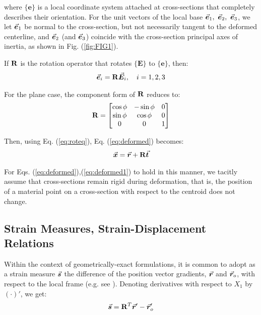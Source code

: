 \noindent where $\{\mathbf{e}\}$ is a local coordinate system attached at
cross-sections that completely describes their orientation. For the unit vectors
of the local base $\vec{\bm{e}}_1,\ \vec{\bm{e}}_2,\ \vec{\bm{e}}_3$, we let $\vec{\bm{e}}_1$ be
normal to the cross-section, but not necessarily tangent to the deformed
centerline, and $\vec{\bm{e}}_2$ (and $\vec{\bm{e}}_3$) coincide with the cross-section
principal axes of inertia, as shown in Fig. (\ref{fig:FIG1}).

If $\mathbf{R}$ is the rotation operator that rotates $\{\mathbf{E}\}$ to
$\{\mathbf{e}\}$, then:
\begin{gather}
	\vec{\bm{e}}_i = \mathbf{R}\vec{\bm{E}}_i ,\quad i=1,2,3
	\label{eq:roteq}
\end{gather}

\noindent For the plane case, the component form of $\mathbf{R}$ reduces to:
\begin{gather}
	\mathbf{R} = \begin{bmatrix}
		\cos\phi &-\sin\phi & 0\\
		\sin\phi &\cos\phi & 0\\
		0 & 0 & 1
	\end{bmatrix}
\end{gather}

\noindent Then, using Eq. (\ref{eq:roteq}), Eq. (\ref{eq:deformed}) becomes:
\begin{gather}
	\vec{\bm{x}} = \vec{\bm{r}} + \mathbf{R}\vec{\bm{t}}
	\label{eq:deformed1}
\end{gather}

\noindent For Eqs. (\ref{eq:deformed}),(\ref{eq:deformed1}) to hold in this
manner, we tacitly assume that cross-sections remain rigid during
deformation, that is, the position of a material point on a cross-section
with respect to the centroid does not change.


\subsection{Strain Measures, Strain-Displacement
Relations}\label{subsection:CH2-S2SS2}
Within the context of geometrically-exact formulations, it is common to adopt as
a strain measure $\vec{\bm{s}}$ the difference of the position vector gradients,
$\vec{\bm{r}}$ and $\vec{\bm{r}}_o$, with respect to the local frame (e.g. see
\cite{Simo1,Cardona,Hodges}). Denoting derivatives with respect to $X_1$
by $(\cdot)'$, we get:			%
\begin{gather}
	\vec{\bm{s}} = \mathbf{R}^T\vec{\bm{r}}'- \vec{\bm{r}}'_o
	\label{eq:strm}
\end{gather}

